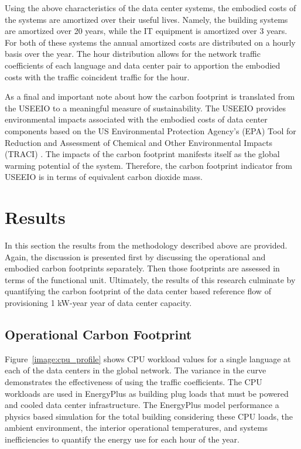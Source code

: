         
        
        
        

        Using the above characteristics of the data center systems, the embodied costs of the systems are amortized over their useful lives. Namely, the building systems are amortized over 20 years, while the IT equipment is amortized over 3 years. For both of these systems the annual amortized costs are distributed on a hourly basis over the year. The hour distribution allows for the network traffic coefficients of each language and data center pair to apportion the embodied costs with the traffic coincident traffic for the hour.
        
        As a final and important note about how the carbon footprint is translated from the USEEIO to a meaningful measure of sustainability. The USEEIO provides environmental impacts associated with the embodied costs of data center components based on the US Environmental Protection Agency's (EPA) Tool for Reduction and Assessment of Chemical and Other Environmental Impacts (TRACI) \cite{EPA12}. The impacts of the carbon footprint manifests itself as the global warming potential of the system. Therefore, the carbon footprint indicator from USEEIO is in terms of equivalent carbon dioxide mass.

\section{Results}
    In this section the results from the methodology described above are provided. Again, the discussion is presented first by discussing the operational and embodied carbon footprints separately. Then those footprints are assessed in terms of the functional unit.  Ultimately, the results of this research culminate by quantifying the carbon footprint of the data center based reference flow of provisioning 1 kW-year year of data center capacity.
    
    \subsection{Operational Carbon Footprint}
    Figure~\ref{image:cpu_profile} shows CPU workload values for a single language at each of the data centers in the global network. The variance in the curve demonstrates the effectiveness of using the traffic coefficients. The CPU workloads are used in EnergyPlus as building plug loads that must be powered and cooled data center infrastructure. The EnergyPlus model performance a physics based simulation for the total building considering these CPU loads, the ambient environment, the interior operational temperatures, and systems inefficiencies to quantify the energy use for each hour of the year.
    
